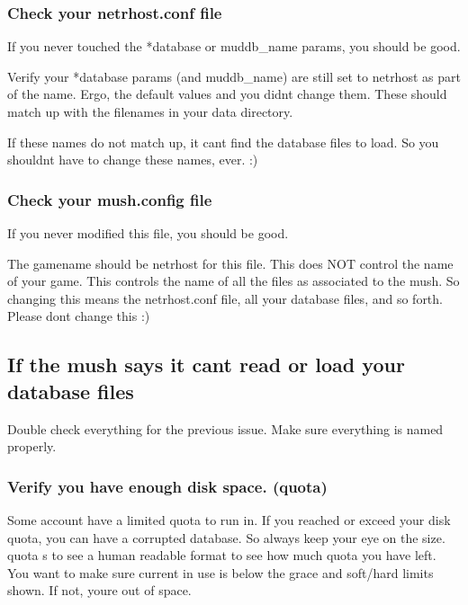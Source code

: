 \documentclass[letterpaper,10pt,english]{sphinxmanual}
\begin{document}
\subsubsection{Check your netrhost.conf file}
\label{\detokenize{troubleshooting:check-your-netrhost-conf-file}}
\sphinxAtStartPar
If you never touched the *database or muddb\_name params, you should be good.

\sphinxAtStartPar
Verify your *database params (and muddb\_name) are still set to \textquotesingle{}netrhost\textquotesingle{} as
part of the name.  Ergo, the default values and you didn\textquotesingle{}t change them.
These should match up with the filenames in your data directory.

\sphinxAtStartPar
If these names do not match up, it can\textquotesingle{}t find the database files to load.
So you shouldn\textquotesingle{}t have to change these names, ever. :)


\subsubsection{Check your mush.config file}
\label{\detokenize{troubleshooting:check-your-mush-config-file}}
\sphinxAtStartPar
If you never modified this file, you should be good.

\sphinxAtStartPar
The gamename should be \textquotesingle{}netrhost\textquotesingle{} for this file.  This does NOT control
the name of your game.  This controls the name of all the files
as associated to the mush.  So changing this means the netrhost.conf
file, all your database files, and so forth.  Please don\textquotesingle{}t change this :)


\subsection{If the mush says it can\textquotesingle{}t read or load your database files}
\label{\detokenize{troubleshooting:if-the-mush-says-it-can-t-read-or-load-your-database-files}}
\sphinxAtStartPar
Double check everything for the previous issue. Make sure everything is named properly.


\subsubsection{Verify you have enough disk space. (quota)}
\label{\detokenize{troubleshooting:verify-you-have-enough-disk-space-quota}}
\sphinxAtStartPar
Some account have a limited quota to run in.  If you reached or exceed
your disk quota, you can have a corrupted database.  So always keep
your eye on the size.  quota \sphinxhyphen{}s to see a human readable format to see
how much quota you have left.  You want to make sure current in use is
below the \textquotesingle{}grace\textquotesingle{} and soft/hard limits shown.  If not, you\textquotesingle{}re out of
space.
\end{document}
